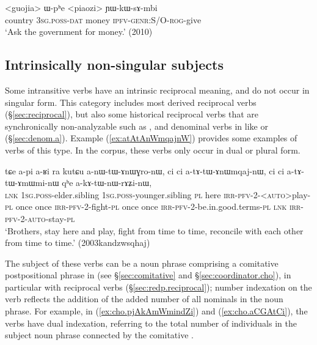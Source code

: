\begin{exe}
\ex   \label{ex:Wphe.piaozi}
 \gll <guojia> ɯ-pʰe <piaozi> ɲɯ-kɯ-sɤ-mbi \\
country \textsc{3sg}.\textsc{poss}-\textsc{dat} money \textsc{ipfv}-\textsc{genr}:S/O-\textsc{rog}-give \\
\glt `Ask the government for money.' (2010)
\end{exe}

\subsection{Intrinsically non-singular subjects} \label{sec:intrinsically.n.sg.subject}
Some intransitive verbs have an intrinsic reciprocal meaning, and do not occur in singular form. This category includes most derived reciprocal verbs (§\ref{sec:reciprocal}), but also some historical reciprocal verbs that are synchronically non-analyzable such as , and denominal verbs in  like  or  (§\ref{sec:denom.a}). Example (\ref{ex:atAtAnWmqajnW}) provides some examples of verbs of this type. In the corpus, these verbs only occur in dual or plural form.

\begin{exe}
\ex   \label{ex:atAtAnWmqajnW}
 \gll tɕe a-pi a-ʁi ra kutɕu a-nɯ-tɯ-ɤnɯɣro-nɯ, ci ci a-tɤ-tɯ-ɤnɯmqaj-nɯ, ci ci a-tɤ-tɯ-ɤmɯmi-nɯ qʰe a-kɤ-tɯ-nɯ-rɤʑi-nɯ, \\
\textsc{lnk} \textsc{1sg}.\textsc{poss}-elder.sibling  \textsc{1sg}.\textsc{poss}-younger.sibling \textsc{pl}  here \textsc{irr}-\textsc{pfv}-2-<\textsc{auto}>play-\textsc{pl} once once \textsc{irr}-\textsc{pfv}-2-fight-\textsc{pl} once once \textsc{irr}-\textsc{pfv}-2-be.in.good.terms-\textsc{pl} \textsc{lnk} \textsc{irr}-\textsc{pfv}-2-\textsc{auto}-stay-\textsc{pl}\\
\glt `Brothers, stay here and play, fight from time to time, reconcile with each other from time to time.' (2003kandzwsqhaj)
\end{exe}

The subject of these verbs can be a noun phrase comprising a comitative postpositional phrase in  (see §\ref{sec:comitative} and §\ref{sec:coordinator.cho}), in particular with reciprocal verbs (§\ref{sec:redp.reciprocal}); number indexation on the verb reflects the addition of the added number of all nominals in the noun phrase. For example, in (\ref{ex:cho.pjAkAmWmindZi}) and (\ref{ex:cho.aCGAtCi}), the verbs have dual indexation, referring to the total number of individuals in the subject noun phrase connected by the comitative .

